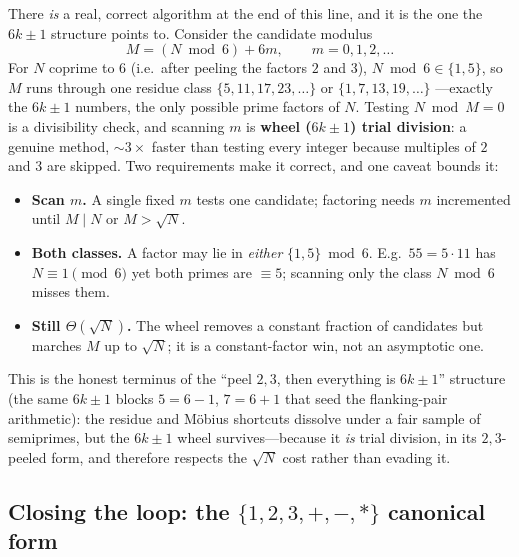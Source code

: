 \documentclass[11pt]{article}
\begin{document}
There \emph{is} a real, correct algorithm at the end of this line, and it is the
one the $6k\pm1$ structure points to. Consider the candidate modulus
\[
M=(N\bmod 6)+6m,\qquad m=0,1,2,\dots
\]
For $N$ coprime to $6$ (i.e.\ after peeling the factors $2$ and $3$), $N\bmod6\in\{1,5\}$,
so $M$ runs through one residue class $\{5,11,17,23,\dots\}$ or $\{1,7,13,19,\dots\}$
---exactly the $6k\pm1$ numbers, the only possible prime factors of $N$. Testing
$N\bmod M=0$ is a divisibility check, and scanning $m$ is
\textbf{wheel ($6k\pm1$) trial division}: a genuine method, $\sim\!3\times$ faster
than testing every integer because multiples of $2$ and $3$ are skipped. Two
requirements make it correct, and one caveat bounds it:
\begin{itemize}[nosep]
\item \textbf{Scan $m$.} A single fixed $m$ tests one candidate; factoring needs
$m$ incremented until $M\mid N$ or $M>\sqrt N$.
\item \textbf{Both classes.} A factor may lie in \emph{either} $\{1,5\}\bmod6$.
E.g.\ $55=5\cdot11$ has $N\equiv1\pmod6$ yet both primes are $\equiv5$; scanning
only the class $N\bmod6$ misses them.
\item \textbf{Still $\Theta(\sqrt N)$.} The wheel removes a constant fraction of
candidates but marches $M$ up to $\sqrt N$; it is a constant-factor win, not an
asymptotic one.
\end{itemize}
This is the honest terminus of the ``peel $2,3$, then everything is $6k\pm1$''
structure (the same $6k\pm1$ blocks $5=6-1$, $7=6+1$ that seed the flanking-pair
arithmetic): the residue and M\"obius shortcuts dissolve under a fair sample of
semiprimes, but the $6k\pm1$ wheel survives---because it \emph{is} trial division,
in its $2,3$-peeled form, and therefore respects the $\sqrt N$ cost rather than
evading it.

\subsection*{Closing the loop: the $\{1,2,3,+,-,*\}$ canonical form}
\end{document}
